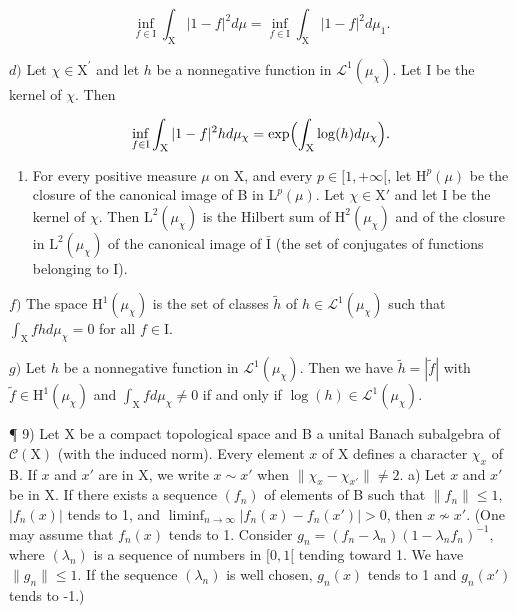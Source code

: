 \[
\inf _ {f \in \mathrm{I}} \int_ {\mathrm{X}} | 1 - f | ^ {2} d \mu = \inf _ {f \in \mathrm{I}} \int_ {\mathrm{X}} | 1 - f | ^ {2} d \mu_ {1}.
\]

\(d)\) Let \(\chi\in\mathrm{X}^{\prime}\) and let \(h\) be a nonnegative function in \(\mathcal{L}^{1}(\mu_{\chi})\). Let I be the kernel of \(\chi\). Then

\[
\inf _ {f \in \mathrm{I}} \int_ {\mathrm{X}} | 1 - f | ^ {2} h d \mu_ {\chi} = \exp \Bigl (\int_ {\mathrm{X}} \log (h) d \mu_ {\chi} \Bigr).
\]

\begin{enumerate}
\def\labelenumi{\alph{enumi})}
\setcounter{enumi}{4}
\tightlist
\item
  For every positive measure \(\mu\) on X, and every \(p \in [1, +\infty[\), let \(\mathrm{H}^p(\mu)\) be the closure of the canonical image of B in \(\mathrm{L}^p(\mu)\). Let \(\chi \in \mathrm{X}'\) and let I be the kernel of \(\chi\). Then \(\mathrm{L}^2(\mu_\chi)\) is the Hilbert sum of \(\mathrm{H}^2(\mu_\chi)\) and of the closure in \(\mathrm{L}^2(\mu_\chi)\) of the canonical image of \(\bar{\mathrm{I}}\) (the set of conjugates of functions belonging to I).
\end{enumerate}

\(f)\) The space \(\mathrm{H}^1 (\mu_\chi)\) is the set of classes \(\widetilde{h}\) of \(h\in \mathcal{L}^1 (\mu_\chi)\) such that \(\int_{\mathrm{X}}fh  d\mu_{\chi} = 0\) for all \(f\in \mathrm{I}\).

\(g)\) Let \(h\) be a nonnegative function in \(\mathcal{L}^1 (\mu_\chi)\). Then we have \(\widetilde{h} = |\widetilde{f}|\) with \(\widetilde{f}\in \mathrm{H}^1 (\mu_\chi)\) and \(\int_{\mathrm{X}}f  d\mu_{\chi}\neq 0\) if and only if \(\log (h)\in \mathcal{L}^1 (\mu_\chi)\).

¶ 9) Let X be a compact topological space and B a unital Banach subalgebra of \(\mathcal{C}(\mathrm{X})\) (with the induced norm). Every element \(x\) of X defines a character \(\chi_x\) of B. If \(x\) and \(x'\) are in X, we write \(x \sim x'\) when \(\| \chi_x - \chi_{x'} \| \neq 2\). a) Let \(x\) and \(x'\) be in X. If there exists a sequence \((f_n)\) of elements of B such that \(\| f_n \| \leqslant 1\), \(|f_n(x)|\) tends to 1, and \(\liminf_{n \to \infty} |f_n(x) - f_n(x')| > 0\), then \(x\not\sim x'\). (One may assume that \(f_n(x)\) tends to 1. Consider \(g_n = (f_n - \lambda_n)(1 - \lambda_n f_n)^{-1}\), where \((\lambda_n)\) is a sequence of numbers in \([0,1[\) tending toward 1. We have \(\| g_n \| \leqslant 1\). If the sequence \((\lambda_n)\) is well chosen, \(g_n(x)\) tends to 1 and \(g_n(x')\) tends to -1.)

